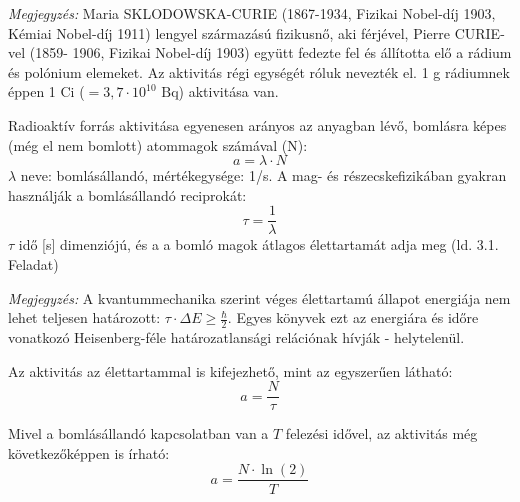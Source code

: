 \documentclass[../main.tex]{subfiles}
\begin{document}
\textit{Megjegyzés:} Maria SKLODOWSKA-CURIE (1867-1934, Fizikai Nobel-díj 1903, Kémiai Nobel-díj 1911) lengyel származású fizikusnő, aki férjével, Pierre CURIE-vel (1859-
1906, Fizikai Nobel-díj 1903) együtt fedezte fel és állította elő a rádium és polónium
elemeket. Az aktivitás régi egységét róluk nevezték el. 1 g rádiumnek éppen 1 Ci
($=3, 7 \cdot 10^{10} \text{ Bq}$) aktivitása van.

Radioaktív forrás aktivitása egyenesen arányos az anyagban lévő, bomlásra képes
(még el nem bomlott) atommagok számával (N):
\begin{equation}
    a = \lambda \cdot N
\end{equation}
$\lambda$ neve: bomlásállandó, mértékegysége: 1/s.
A mag- és részecskefizikában gyakran használják a bomlásállandó reciprokát:
\begin{equation}
    \tau = \frac{1}{\lambda}
\end{equation}
$\tau$ idő [s] dimenziójú, és a a bomló magok átlagos élettartamát adja meg (ld. 3.1.
Feladat)

\textit{Megjegyzés:} A kvantummechanika szerint véges élettartamú állapot energiája nem
lehet teljesen határozott: $\tau \cdot \Delta E \geq \frac{\hbar}{2}$. Egyes könyvek ezt az energiára és időre vonatkozó
Heisenberg-féle határozatlansági relációnak hívják - helytelenül.

Az aktivitás az élettartammal is kifejezhető, mint az egyszerűen látható:
\begin{equation}
    a = \frac{N}{\tau}
\end{equation}

Mivel a bomlásállandó kapcsolatban van a $T$ felezési idővel, az aktivitás még következőképpen is írható:
\begin{equation}
    a = \frac{N \cdot \ln(2)}{T}
\end{equation}
\end{document}
